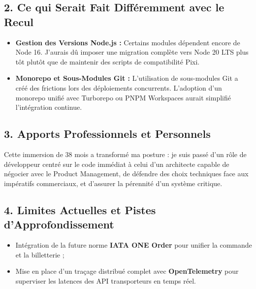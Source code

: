 \documentclass[11pt,a4paper]{article}
\begin{document}
\subsection*{2. Ce qui Serait Fait Différemment avec le Recul}
\begin{itemize}[itemsep=2pt]
    \item \textbf{Gestion des Versions Node.js :} Certains modules dépendent encore de Node 16. J'aurais dû imposer une migration complète vers Node 20 LTS plus tôt plutôt que de maintenir des scripts de compatibilité Pixi.
    \item \textbf{Monorepo et Sous-Modules Git :} L'utilisation de sous-modules Git a créé des frictions lors des déploiements concurrents. L'adoption d'un monorepo unifié avec Turborepo ou PNPM Workspaces aurait simplifié l'intégration continue.
\end{itemize}

\subsection*{3. Apports Professionnels et Personnels}
Cette immersion de 38 mois a transformé ma posture : je suis passé d'un rôle de développeur centré sur le code immédiat à celui d'un architecte capable de négocier avec le Product Management, de défendre des choix techniques face aux impératifs commerciaux, et d'assurer la pérennité d'un système critique.

\subsection*{4. Limites Actuelles et Pistes d'Approfondissement}
\begin{itemize}[itemsep=2pt]
    \item Intégration de la future norme \textbf{IATA ONE Order} pour unifier la commande et la billetterie ;
    \item Mise en place d'un traçage distribué complet avec \textbf{OpenTelemetry} pour superviser les latences des API transporteurs en temps réel.
\end{itemize}
\end{document}
